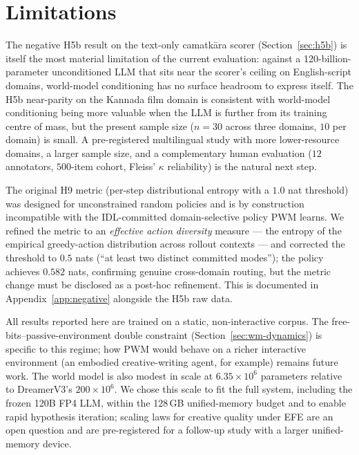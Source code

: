 \documentclass[journal,onecolumn,11pt]{IEEEtran}
\begin{document}
\section{Limitations}\label{sec:limitations}

The negative H5b result on the text-only camatkāra scorer
(Section~\ref{sec:h5b}) is itself the most material limitation of the
current evaluation: against a 120-billion-parameter unconditioned LLM that
sits near the scorer's ceiling on English-script domains, world-model
conditioning has no surface headroom to express itself.
The H5b near-parity on the Kannada film domain is consistent with
world-model conditioning being more valuable when the LLM is further from
its training centre of mass, but the present sample size ($n=30$ across
three domains, $10$ per domain) is small.
A pre-registered multilingual study with more lower-resource domains, a
larger sample size, and a complementary human evaluation
($12$ annotators, $500$-item cohort, Fleiss' $\kappa$ reliability) is the
natural next step.

The original H9 metric (per-step distributional entropy with a $1.0$ nat
threshold) was designed for unconstrained random policies and is by
construction incompatible with the IDL-committed domain-selective policy
PWM learns.
We refined the metric to an \emph{effective action diversity} measure ---
the entropy of the empirical greedy-action distribution across rollout
contexts --- and corrected the threshold to $0.5$ nats (``at least two
distinct committed modes''); the policy achieves $0.582$ nats, confirming
genuine cross-domain routing, but the metric change must be disclosed as a
post-hoc refinement.
This is documented in Appendix~\ref{app:negative} alongside the H5b raw
data.

All results reported here are trained on a static, non-interactive corpus.
The free-bits--passive-environment double constraint
(Section~\ref{sec:wm-dynamics}) is specific to this regime; how PWM would
behave on a richer interactive environment (an embodied creative-writing
agent, for example) remains future work.
The world model is also modest in scale at $6.35\times 10^{6}$ parameters
relative to DreamerV3's $200\times 10^{6}$.
We chose this scale to fit the full system, including the frozen 120B FP4
LLM, within the 128\,GB unified-memory budget and to enable rapid
hypothesis iteration; scaling laws for creative quality under EFE are an
open question and are pre-registered for a follow-up study with a larger
unified-memory device.
\end{document}
